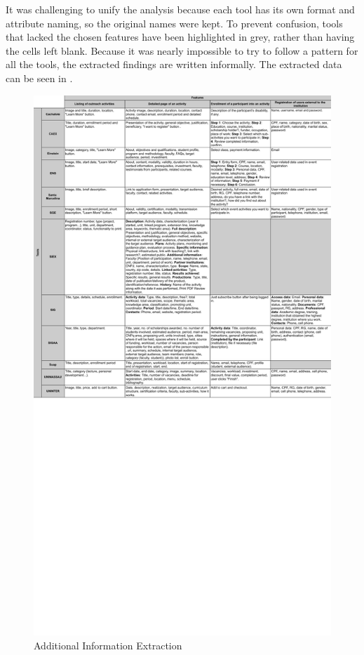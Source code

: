 It was challenging to unify the analysis because each tool has its own format and attribute naming, so the original names were kept. To prevent confusion, tools that lacked the chosen features have been highlighted in grey, rather than having the cells left blank. Because it was nearly impossible to try to follow a pattern for all the tools, the extracted findings are written informally. The extracted data can be seen in .

\begin{figure}[!htb]
  \caption{Additional Information Extraction}\label{fig:gl-additional-extraction}
  \begin{center}
    \includegraphics[width=16cm]{img/4-data-extraction-2.pdf}
  \end{center}
\end{figure}

